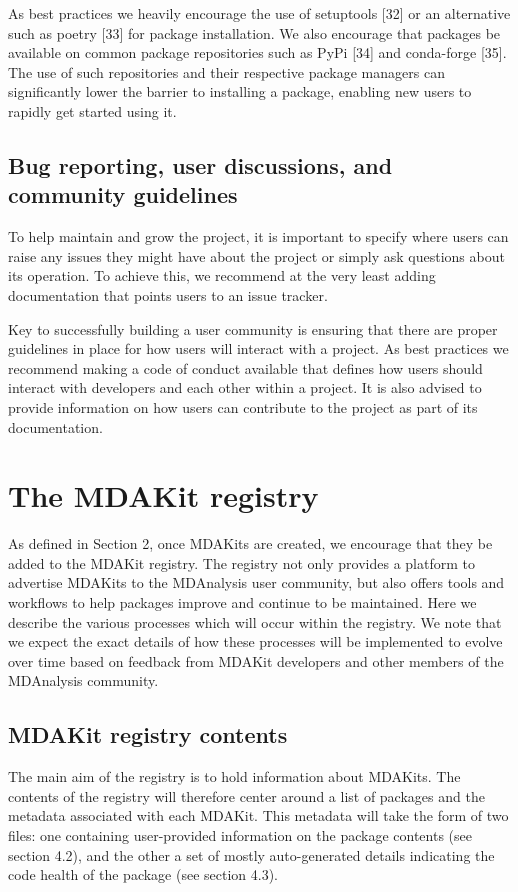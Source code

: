 \documentclass{article}
\begin{document}
As best practices we heavily encourage the use of setuptools [32] or an alternative such as poetry [33] for package installation. We also encourage that packages be available on common package repositories such as PyPi [34] and conda-forge [35]. The use of such repositories and their respective package managers can significantly lower the barrier to installing a package, enabling new users to rapidly get started using it.

\subsection{Bug reporting, user discussions, and community guidelines}

To help maintain and grow the project, it is important to specify where users can raise any issues they might have about the project or simply ask questions about its operation. To achieve this, we recommend at the very least adding documentation that points users to an issue tracker.

Key to successfully building a user community is ensuring that there are proper guidelines in place for how users will interact with a project. As best practices we recommend making a code of conduct available that defines how users should interact with developers and each other within a project. It is also advised to provide information on how users can contribute to the project as part of its documentation.


\section{The MDAKit registry}

As defined in Section 2, once MDAKits are created, we encourage that they be added to the MDAKit registry. The registry not only provides a platform to advertise MDAKits to the MDAnalysis user community, but also offers tools and workflows to help packages improve and continue to be maintained. Here we describe the various processes which will occur within the registry. We note that we expect the exact details of how these processes will be implemented to evolve over time based on feedback from MDAKit developers and other members of the MDAnalysis community.
 
\subsection{MDAKit registry contents}

The main aim of the registry is to hold information about MDAKits. The contents of the registry will therefore center around a list of packages and the metadata associated with each MDAKit. This metadata will take the form of two files: one containing user-provided information on the package contents (see section 4.2), and the other a set of mostly auto-generated details indicating the code health of the package (see section 4.3). 
\end{document}
